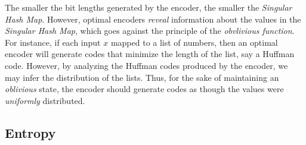 \documentclass[11pt,final,hidelinks]{article}
\begin{document}
The smaller the bit lengths generated by the encoder, the smaller the \emph{Singular Hash Map}.
However, optimal encoders \emph{reveal} information about the values in the \emph{Singular Hash Map}, which goes against the principle of the \emph{obvlivious function}.
For instance, if each input $x$ mapped to a list of numbers, then an optimal encoder will generate codes that minimize the length of the list, say a Huffman code.
However, by analyzing the Huffman codes produced by the encoder, we may infer the distribution of the lists.
Thus, for the sake of maintaining an \emph{oblivious} state, the encoder should generate codes as though the values were \emph{uniformly} distributed.

\subsection{Entropy}

%
%
%
%




\end{document}
